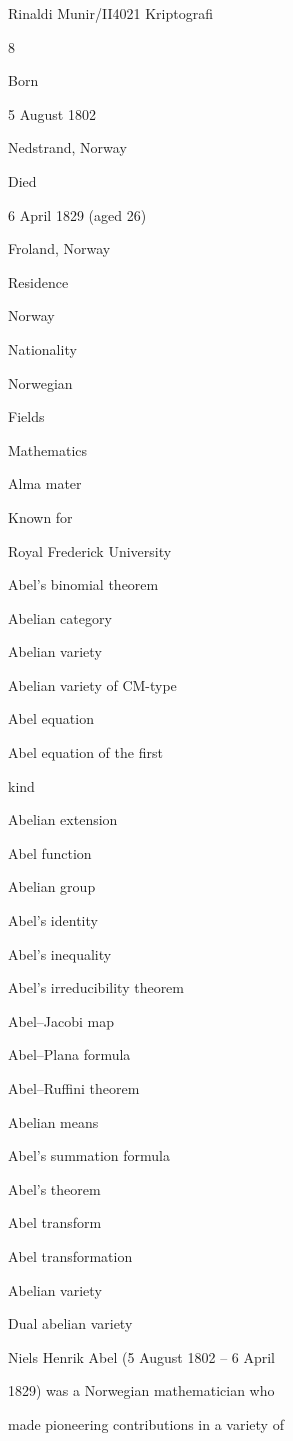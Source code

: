 \documentclass{article}
\begin{document}

Rinaldi Munir/II4021 Kriptografi

8

Born

5 August 1802

Nedstrand, Norway

Died

6 April 1829 (aged 26)

Froland, Norway

Residence

Norway

Nationality

Norwegian

Fields

Mathematics

Alma mater

Known for

Royal Frederick University

Abel's binomial theorem

Abelian category

Abelian variety

Abelian variety of CM-type

Abel equation

Abel equation of the first 

kind

Abelian extension

Abel function

Abelian group

Abel's identity

Abel's inequality

Abel's irreducibility theorem

Abel–Jacobi map

Abel–Plana formula

Abel–Ruffini theorem

Abelian means

Abel's summation formula

Abel's theorem

Abel transform

Abel transformation

Abelian variety

Dual abelian variety

Niels Henrik Abel (5 August 1802 – 6 April 

1829) was a Norwegian mathematician who 

made pioneering contributions in a variety of 
\end{document}

